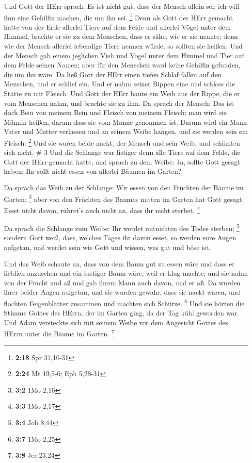  Und Gott der HErr sprach: Es ist nicht gut, dass der
Mensch allein sei; ich will ihm eine Gehilfin machen, die um ihn sei.
\footnote{\textbf{2:18} Spr 31,10-31}  Denn als Gott der
HErr gemacht hatte von der Erde allerlei Tiere auf dem Felde und
allerlei Vögel unter dem Himmel, brachte er sie zu dem Menschen, dass er
sähe, wie er sie nennte; denn wie der Mensch allerlei lebendige Tiere
nennen würde, so sollten sie heißen.  Und der Mensch gab
einem jeglichen Vieh und Vogel unter dem Himmel und Tier auf dem Felde
seinen Namen; aber für den Menschen ward keine Gehilfin gefunden, die um
ihn wäre.  Da ließ Gott der HErr einen tiefen Schlaf fallen
auf den Menschen, und er schlief ein. Und er nahm seiner Rippen eine und
schloss die Stätte zu mit Fleisch.  Und Gott der HErr baute
ein Weib aus der Rippe, die er vom Menschen nahm, und brachte sie zu
ihm.  Da sprach der Mensch: Das ist doch Bein von meinem
Bein und Fleisch von meinem Fleisch; man wird sie Männin heißen, darum
dass sie vom Manne genommen ist.  Darum wird ein Mann Vater
und Mutter verlassen und an seinem Weibe hangen, und sie werden sein ein
Fleisch. \footnote{\textbf{2:24} Mt 19,5-6; Eph 5,28-31} 
Und sie waren beide nackt, der Mensch und sein Weib, und schämten sich
nicht. \# 3  Und die Schlange war listiger denn alle Tiere
auf dem Felde, die Gott der HErr gemacht hatte, und sprach zu dem Weibe:
Ja, sollte Gott gesagt haben: Ihr sollt nicht essen von allerlei Bäumen
im Garten?

 Da sprach das Weib zu der Schlange: Wir essen von den
Früchten der Bäume im Garten; \footnote{\textbf{3:2} 1Mo 2,16}
 aber von den Früchten des Baumes mitten im Garten hat Gott
gesagt: Esset nicht davon, rühret's auch nicht an, dass ihr nicht
sterbet. \footnote{\textbf{3:3} 1Mo 2,17}

 Da sprach die Schlange zum Weibe: Ihr werdet mitnichten des
Todes sterben; \footnote{\textbf{3:4} Joh 8,44}  sondern
Gott weiß, dass, welches Tages ihr davon esset, so werden eure Augen
aufgetan, und werdet sein wie Gott und wissen, was gut und böse ist.

 Und das Weib schaute an, dass von dem Baum gut zu essen
wäre und dass er lieblich anzusehen und ein lustiger Baum wäre, weil er
klug machte; und sie nahm von der Frucht und aß und gab ihrem Mann auch
davon, und er aß.  Da wurden ihrer beider Augen aufgetan,
und sie wurden gewahr, dass sie nackt waren, und flochten Feigenblätter
zusammen und machten sich Schürze. \footnote{\textbf{3:7} 1Mo 2,25}
 Und sie hörten die Stimme Gottes des HErrn, der im Garten
ging, da der Tag kühl geworden war. Und Adam versteckte sich mit seinem
Weibe vor dem Angesicht Gottes des HErrn unter die Bäume im Garten.
\footnote{\textbf{3:8} Jer 23,24}

